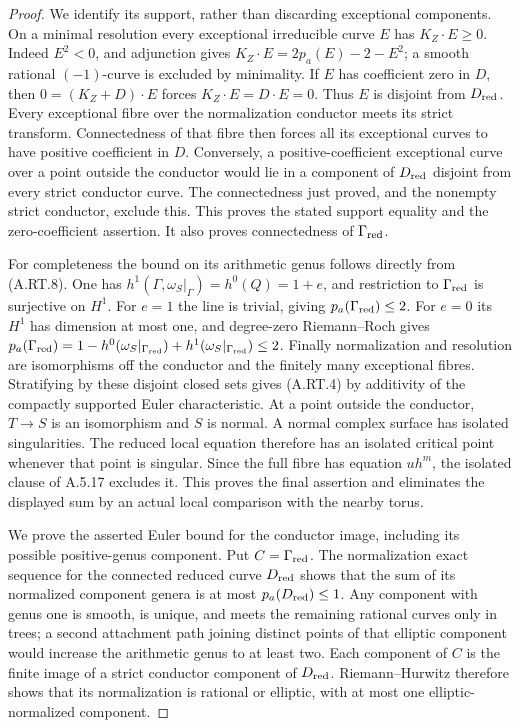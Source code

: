 \begin{proof}
We identify its support, rather than discarding exceptional
components. On a minimal resolution every exceptional
irreducible curve $E$ has $K_Z\cdot E\ge0$. Indeed
$E^2<0$, and adjunction gives
$K_Z\cdot E=2p_a(E)-2-E^2$; a smooth rational
$(-1)$-curve is excluded by minimality. If $E$ has coefficient
zero in $D$, then
$0=(K_Z+D)\cdot E$ forces $K_Z\cdot E=D\cdot E=0$.
Thus $E$ is disjoint from $D_{\rm red}$.
Every exceptional fibre over the normalization conductor meets
its strict transform. Connectedness of that fibre then forces
all its exceptional curves to have positive coefficient in $D$.
Conversely, a positive-coefficient exceptional curve over a point
outside the conductor would lie in a component of $D_{\rm red}$
disjoint from every strict conductor curve. The connectedness
just proved, and the nonempty strict conductor, exclude this.
This proves the stated support equality and the zero-coefficient
assertion. It also proves connectedness of $\Gamma_{\rm red}$.

For completeness the bound on its arithmetic genus follows
directly from (A.RT.8). One has
$h^1(\Gamma,\omega_S|_\Gamma)=h^0(Q)=1+e$,
and restriction to $\Gamma_{\rm red}$ is surjective on $H^1$.
For $e=1$ the line is trivial, giving
$p_a(\Gamma_{\rm red})\le2$. For $e=0$ its $H^1$ has
dimension at most one, and degree-zero Riemann--Roch gives
$p_a(\Gamma_{\rm red})=1-h^0(\omega_S|_{\Gamma_{\rm red}})
+h^1(\omega_S|_{\Gamma_{\rm red}})\le2$.
Finally normalization and resolution are isomorphisms off the
conductor and the finitely many exceptional fibres.
Stratifying by these disjoint closed sets gives (A.RT.4) by
additivity of the compactly supported Euler characteristic.
At a point outside the conductor, $T\to S$ is an
isomorphism and $S$ is normal. A normal complex surface
has isolated singularities. The reduced local equation
therefore has an isolated critical point whenever that
point is singular. Since the full fibre has equation
$u h^m$, the isolated clause of A.5.17 excludes it.
This proves the final assertion and eliminates the displayed
sum by an actual local comparison with the nearby torus.

We prove the asserted Euler bound for the conductor image,
including its possible positive-genus component. Put
$C=\Gamma_{\rm red}$. The normalization exact sequence for
the connected reduced curve $D_{\rm red}$ shows that the sum
of its normalized component genera is at most
$p_a(D_{\rm red})\le1$. Any component with genus one is
smooth, is unique, and meets the remaining rational curves
only in trees; a second attachment path joining distinct
points of that elliptic component would increase the
arithmetic genus to at least two. Each component of $C$ is
the finite image of a strict conductor component of
$D_{\rm red}$. Riemann--Hurwitz therefore shows that its
normalization is rational or elliptic, with at most one
elliptic-normalized component.


\end{proof}
